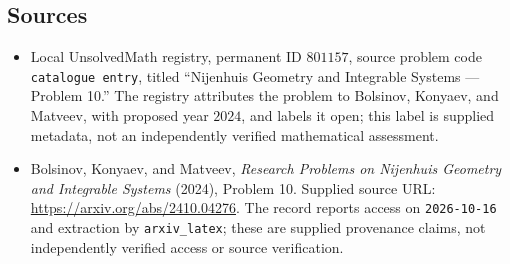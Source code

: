 \documentclass[11pt]{article}
\begin{document}
\subsection{Sources}
\begin{itemize}
\item Local UnsolvedMath registry, permanent ID \(801157\), source problem code \texttt{catalogue entry}, titled ``Nijenhuis Geometry and Integrable Systems --- Problem 10.'' The registry attributes the problem to Bolsinov, Konyaev, and Matveev, with proposed year \(2024\), and labels it open; this label is supplied metadata, not an independently verified mathematical assessment.
\item Bolsinov, Konyaev, and Matveev, \emph{Research Problems on Nijenhuis Geometry and Integrable Systems} (2024), Problem 10. Supplied source URL: \url{https://arxiv.org/abs/2410.04276}. The record reports access on \texttt{2026-10-16} and extraction by \texttt{arxiv\_latex}; these are supplied provenance claims, not independently verified access or source verification.
\end{itemize}
\end{document}
